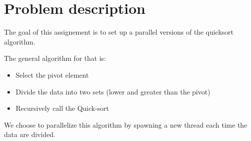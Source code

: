 \chapter{Problem description}

The goal of this assignement is to set up a parallel versions of the quicksort algorithm.

The general algorithm for that is:
\begin{itemize}
  \item Select the pivot element
  \item Divide the data into two sets (lower and greater than the pivot)
  \item Recursively call the Quick-sort 
\end{itemize}

We choose to parallelize this algorithm by spawning a new thread each time the data are divided.
